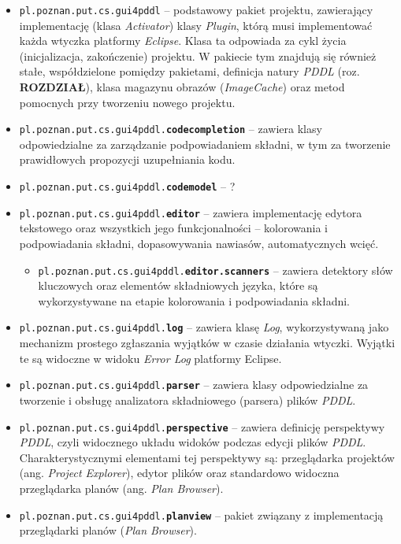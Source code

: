 \begin{itemize}
\item \texttt{pl.poznan.put.cs.gui4pddl} -- podstawowy pakiet projektu, zawierający implementację (klasa \textit{Activator}) klasy \textit{Plugin}, którą musi implementować każda wtyczka platformy \textit{Eclipse}. Klasa ta odpowiada za cykl życia (inicjalizacja, zakończenie) projektu. W pakiecie tym znajdują się również stałe, współdzielone pomiędzy pakietami, definicja natury \textit{PDDL} (roz. \textbf{ROZDZIAŁ}), klasa magazynu obrazów (\textit{ImageCache}) oraz metod pomocnych przy tworzeniu nowego projektu.
\item \texttt{pl.poznan.put.cs.gui4pddl.\textbf{codecompletion}} -- zawiera klasy odpowiedzialne za zarządzanie podpowiadaniem składni, w tym za tworzenie prawidłowych propozycji uzupełniania kodu.
\item \texttt{pl.poznan.put.cs.gui4pddl.\textbf{codemodel}} -- ?
\item \texttt{pl.poznan.put.cs.gui4pddl.\textbf{editor}} -- zawiera implementację edytora tekstowego oraz wszystkich jego funkcjonalności -- kolorowania i podpowiadania składni, dopasowywania nawiasów, automatycznych wcięć.
\begin{itemize}
\item \texttt{pl.poznan.put.cs.gui4pddl.\textbf{editor.scanners}} -- zawiera detektory słów kluczowych oraz elementów składniowych języka, które są wykorzystywane na etapie kolorowania i podpowiadania składni.
\end{itemize}
\item \texttt{pl.poznan.put.cs.gui4pddl.\textbf{log}} -- zawiera klasę \textit{Log}, wykorzystywaną jako mechanizm prostego zgłaszania wyjątków w czasie działania wtyczki. Wyjątki te są widoczne w widoku \textit{Error Log} platformy Eclipse.
\item \texttt{pl.poznan.put.cs.gui4pddl.\textbf{parser}} -- zawiera klasy odpowiedzialne za tworzenie i obsługę analizatora składniowego (parsera) plików \textit{PDDL}.
\item \texttt{pl.poznan.put.cs.gui4pddl.\textbf{perspective}} -- zawiera definicję perspektywy \textit{PDDL}, czyli widocznego układu widoków podczas edycji plików \textit{PDDL}. Charakterystycznymi elementami tej perspektywy są: przeglądarka projektów (ang. \textit{Project Explorer}), edytor plików oraz standardowo widoczna przeglądarka planów (ang. \textit{Plan Browser}).
\item \texttt{pl.poznan.put.cs.gui4pddl.\textbf{planview}} -- pakiet związany z implementacją przeglądarki planów (\textit{Plan Browser}).

\end{itemize}
